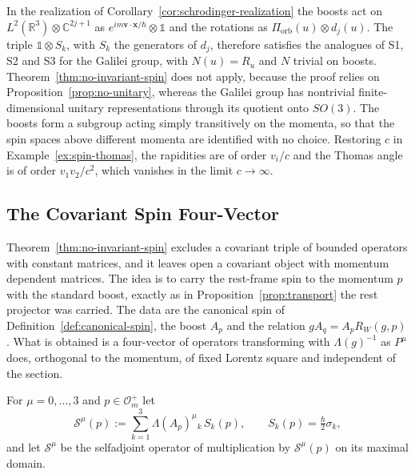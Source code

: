 \begin{remark}\label{rem:spin-galilean}
	In the realization of Corollary~\ref{cor:schrodinger-realization} the boosts act on $L^2(\mathbb{R}^3)\otimes\mathbb{C}^{2j+1}$ as $e^{im\mathbf{v}\cdot\mathbf{x}/\hbar}\otimes\mathbb{1}$ and the rotations as $\Pi_{\mathrm{orb}}(u)\otimes d_j(u)$. The triple $\mathbb{1}\otimes S_k$, with $S_k$ the generators of $d_j$, therefore satisfies the analogues of S1, S2 and S3 for the Galilei group, with $N(u)=R_u$ and $N$ trivial on boosts. Theorem~\ref{thm:no-invariant-spin} does not apply, because the proof relies on Proposition~\ref{prop:no-unitary}, whereas the Galilei group has nontrivial finite-dimensional unitary representations through its quotient onto $SO(3)$. The boosts form a subgroup acting simply transitively on the momenta, so that the spin spaces above different momenta are identified with no choice. Restoring $c$ in Example~\ref{ex:spin-thomas}, the rapidities are of order $v_i/c$ and the Thomas angle is of order $v_1v_2/c^2$, which vanishes in the limit $c\to\infty$.
\end{remark}

\subsection{The Covariant Spin Four-Vector}
\label{subsec:spin-four-vector}

Theorem~\ref{thm:no-invariant-spin} excludes a covariant triple of bounded operators with constant matrices, and it leaves open a covariant object with momentum dependent matrices. The idea is to carry the rest-frame spin to the momentum $p$ with the standard boost, exactly as in Proposition~\ref{prop:transport} the rest projector was carried. The data are the canonical spin of Definition~\ref{def:canonical-spin}, the boost $A_p$ and the relation $gA_q=A_pR_W(g,p)$. What is obtained is a four-vector of operators transforming with $\Lambda(g)^{-1}$ as $P^\mu$ does, orthogonal to the momentum, of fixed Lorentz square and independent of the section.

\begin{definition}\label{def:spin-four-vector}
	For $\mu=0,\dots,3$ and $p\in\mathcal{O}_m^+$ let
	\begin{equation*}
		\mathcal{S}^\mu(p):=\sum_{k=1}^3\Lambda(A_p)^\mu{}_k\,S_k(p),\qquad S_k(p)=\tfrac\hbar2\sigma_k,
	\end{equation*}
	and let $\mathcal{S}^\mu$ be the selfadjoint operator of multiplication by $\mathcal{S}^\mu(p)$ on its maximal domain.
\end{definition}

